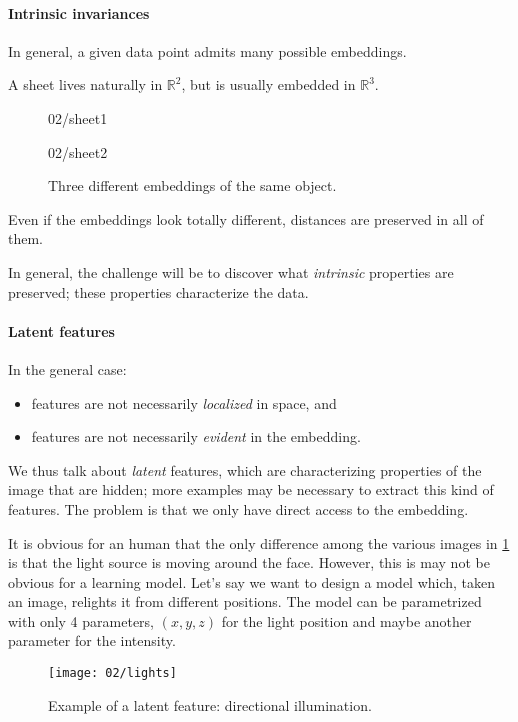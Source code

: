 \paragraph{Intrinsic invariances}
In general, a given data point admits many possible embeddings.
\begin{ex}
	A sheet lives naturally in $\mathbb{R}^2$, but is usually embedded in $\mathbb{R}^3$.

	\begin{figure}[H]
		\begin{center}
			\begin{overpic}[trim=0cm 0cm 0cm 0cm,clip,width=0.2\linewidth]
				{02/sheet1}
			\end{overpic}
			\begin{overpic}[trim=0cm 0cm 0cm 0cm,clip,width=0.5\linewidth]
				{02/sheet2}
			\end{overpic}
		\end{center}
		\caption{Three different embeddings of the same object.}
	\end{figure}
	Even if the embeddings look totally different, distances are preserved in all of them.
\end{ex}

In general, the challenge will be to discover what \emph{intrinsic} properties are preserved; these properties characterize the data.

\paragraph{Latent features}
In the general case:

\begin{itemize}
	\item features are not necessarily \emph{localized} in space, and
	\item features are not necessarily \emph{evident} in the embedding.
\end{itemize}

We thus talk about \emph{latent} features, which are characterizing properties of the image that are hidden; more examples may be necessary to extract this kind of features. The problem is that we only have direct access to the embedding.

\begin{ex}
	It is obvious for an human that the only difference among the various images in \cref{fig:lights} is that the light source is moving around the face. However, this is may not be obvious for a learning model. Let's say we want to design a model which, taken an image, relights it from different positions. The model can be parametrized with only 4 parameters, $(x,y,z)$ for the light position and maybe another parameter for the intensity. 
	\begin{figure}[H]
		\centering
		\texttt{[image: 02/lights]}
		\caption{Example of a latent feature: directional illumination.}\label{fig:lights}	
	\end{figure}
\end{ex}

